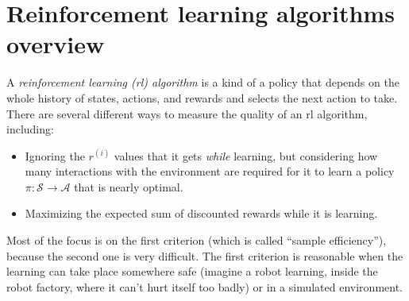 

\section{Reinforcement learning algorithms overview}
\label{rl}

A {\em reinforcement learning ({\sc rl})
    algorithm} is a kind of a
policy that depends on the whole history of states, actions, and
rewards and selects the next action to take. There are several
different ways to measure the quality of an {\sc rl} algorithm,
including:
\begin{itemize}
  \item Ignoring the $r^{(i)}$ values that it gets {\em while} learning,
        but considering how many interactions with the environment are
        required for it to learn a policy $\pi: \mathcal{S} \rightarrow
          \mathcal{A}$ that is nearly optimal.
  \item Maximizing the expected sum of discounted rewards while
        it is learning.
\end{itemize}
Most of the focus is on the first criterion (which is called ``sample efficiency''), because the second one is
very difficult.  The first criterion is reasonable when the learning
can take place somewhere safe (imagine a robot learning, inside the
robot factory, where it can't hurt itself too badly) or in a simulated
environment.

